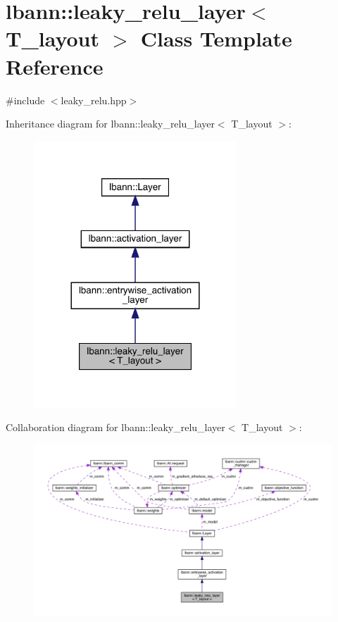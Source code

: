 \hypertarget{classlbann_1_1leaky__relu__layer}{}\section{lbann\+:\+:leaky\+\_\+relu\+\_\+layer$<$ T\+\_\+layout $>$ Class Template Reference}
\label{classlbann_1_1leaky__relu__layer}


{\ttfamily \#include $<$leaky\+\_\+relu.\+hpp$>$}



Inheritance diagram for lbann\+:\+:leaky\+\_\+relu\+\_\+layer$<$ T\+\_\+layout $>$\+:\nopagebreak
\begin{figure}[H]
\begin{center}
\leavevmode
\includegraphics[width=216pt]{classlbann_1_1leaky__relu__layer__inherit__graph}
\end{center}
\end{figure}


Collaboration diagram for lbann\+:\+:leaky\+\_\+relu\+\_\+layer$<$ T\+\_\+layout $>$\+:\nopagebreak
\begin{figure}[H]
\begin{center}
\leavevmode
\includegraphics[width=350pt]{classlbann_1_1leaky__relu__layer__coll__graph}
\end{center}
\end{figure}
